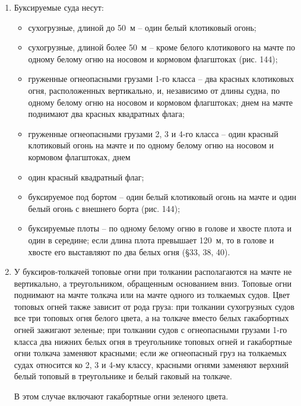 \documentclass[a4paper, 12pt, twoside, final]{scrbook}
\begin{document}
\begin{enumerate}
\item Буксируемые суда несут:

\begin{itemize}
\item сухогрузные, длиной до 50~м \--- один белый клотиковый огонь;

\item сухогрузные, длиной более 50~м \--- кроме белого клотикового на мачте по одному белому огню на носовом и кормовом флагштоках (рис. 144);

\item груженные огнеопасными грузами 1-го класса \--- два красных клотиковых огня, расположенных вертикально, и, независимо от длины судна, по одному белому огню на носовом и кормовом флагштоках; днем на мачте поднимают два красных квадратных флага;

\item груженные огнеопасными грузами 2, 3 и 4-го класса \--- один красный клотиковый огонь на мачте и по одному белому огню на носовом и кормовом флагштоках, днем 

\item один красный квадратный флаг;

\item буксируемое под бортом \--- один белый клотиковый огонь на мачте и один белый огонь с внешнего борта (рис. 144);

\item буксируемые плоты \--- по одному белому огню в голове и хвосте плота и один в середине; если длина плота превышает 120~м, то в голове и хвосте его выставляют по два белых огня (\S 33, 38, 40).
\end{itemize}

\item У буксиров-толкачей топовые огни при толкании располагаются на мачте не вертикально, а треугольником, обращенным основанием вниз. Топовые огни поднимают на мачте толкача или на мачте одного из толкаемых судов. Цвет топовых огней также зависит от рода груза: при толкании сухогрузных судов все три топовых огня белого цвета, а на толкаче вместо белых гакабортных огней зажигают зеленые; при толкании судов с огнеопасными грузами 1-го класса два нижних белых огня в треугольнике топовых огней и гакабортные огни толкача заменяют красными; если же огнеопасный груз на толкаемых судах относится ко 2, 3 и 4-му классу, красными огнями заменяют верхний белый топовый в треугольнике и белый гаковый на толкаче.

В этом случае включают гакабортные огни зеленого цвета.


\end{enumerate}
\end{document}
